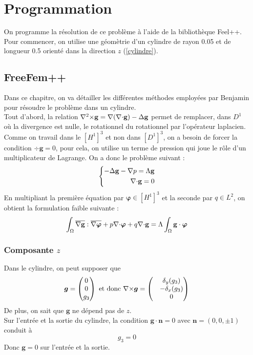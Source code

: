 \chapter{Programmation}

On programme la résolution de ce problème à l'aide de la bibliothèque Feel++. Pour commencer, on utilise une géomètrie d'un cylindre de rayon 0.05 et de longueur 0.5 orienté dans la direction $z$ (\ref{cylindre}).
\section{FreeFem++}
Dans ce chapitre, on va détailler les différentes méthodes employées par Benjamin pour résoudre le problème dans un cylindre.\\
Tout d'abord, la relation ${\nabla^2\times} \mathbf{g} = {\nabla}({\nabla\cdot} \mathbf{g}) - {\Delta} \mathbf{g}$ permet de remplacer, dans $D^1$ où la divergence est nulle, le rotationnel du rotationnel par l'opérateur laplacien.\\
Comme on travail dans le $[H^1]^3$ et non dans $[D^1]^3$, on a besoin de forcer la condition $\div\mathbf{g}=0$, pour cela, on utilise un terme de pression qui joue le rôle d'un multiplicateur de Lagrange. On a donc le problème suivant :
\begin{equation}
\left\{
\begin{aligned}
-{\Delta}\mathbf{g} - {\nabla} p = \Lambda \mathbf{g}\\
{\nabla\cdot} \mathbf{g}=0
\end{aligned}
\right.
\end{equation}
En multipliant la première équation par $\bm{\varphi}\in [H^1]^3$ et la seconde par $q\in L^2$, on obtient la formulation faible suivante :
\begin{equation*}
\int_\Omega \overline{{\nabla}\mathbf{g}}:\overline{{\nabla}\bm{\varphi}} + p{\nabla\cdot}\bm{\varphi} + q{\nabla\cdot}\mathbf{g} = \Lambda \int_\Omega \mathbf{g}\cdot\bm{\varphi}
\end{equation*}

\subsection{Composante $z$}
\label{freefem1d}
Dans le cylindre, on peut supposer que 
\[
\bm{g}=
\begin{pmatrix}
0\\
0\\
g_3
\end{pmatrix}
\text{ et donc }
{\nabla\times}\bm{g}=
\begin{pmatrix}
&\delta_y(g_3)\\
&-\delta_x(g_3)\\
&0
\end{pmatrix}
\]
De plus, on sait que $\bm{g}$ ne dépend pas de $z$.\\
Sur l'entrée et la sortie du cylindre, la condition $\bm{g}\cdot \bm{n}=0$ avec $\bm{n}=(0,0,\pm 1)$ conduit à \[g_3 = 0\]
Donc $\bm{g}=0$ sur l'entrée et la sortie.\\

